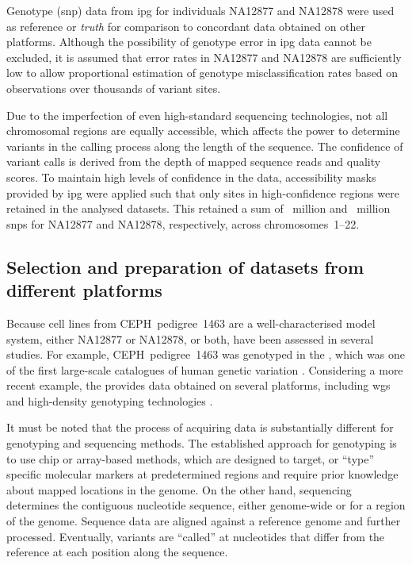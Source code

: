 %

%

Genotype (\gls{snp}) data from \gls{ipg} for individuals \textsf{NA12877} and \textsf{NA12878} were used as reference or \emph{truth} for comparison to concordant data obtained on other platforms.
Although the possibility of genotype error in \gls{ipg} data cannot be excluded, it is assumed that error rates in \textsf{NA12877} and \textsf{NA12878} are sufficiently low to allow proportional estimation of genotype misclassification rates based on observations over thousands of variant sites.

Due to the imperfection of even high-standard sequencing technologies, not all chromosomal regions are equally accessible, which affects the power to determine variants in the calling process along the length of the sequence.
The confidence of variant calls is derived from the depth of mapped sequence reads and quality scores.
To maintain high levels of confidence in the data, accessibility masks provided by \gls{ipg} were applied such that only sites in high-confidence regions were retained in the analysed datasets.
This retained a sum of ~million and ~million \glspl{snp} for \textsf{NA12877} and \textsf{NA12878}, respectively, across chromosomes~1--22.


%
\subsection{Selection and preparation of datasets from different platforms}
%

Because cell lines from CEPH~pedigree~1463 are a well-characterised model system, either \textsf{NA12877} or \textsf{NA12878}, or both, have been assessed in several studies.
For example, CEPH~pedigree~1463 was genotyped in the , which was one of the first large-scale catalogues of human genetic variation \citep{Thorisson:2005ff,Frazer:2007kha,InternationalHapMapConsortium:2010en}.
Considering a more recent example, the  provides data obtained on several platforms, including \gls{wgs} and high-density genotyping technologies \citep{Durbin:2010gj,GenomesProjectConsortium:2012co,Auton:2015gk}.

It must be noted that the process of acquiring data is substantially different for genotyping and sequencing methods.
The established approach for genotyping is to use chip or array-based methods, which are designed to target, or ``type'' specific molecular markers at predetermined regions and require prior knowledge about mapped locations in the genome.
On the other hand, sequencing determines the contiguous nucleotide sequence, either genome-wide or for a region of the genome.
Sequence data are aligned against a reference genome and further processed.
Eventually, variants are ``called'' at nucleotides that differ from the reference at each position along the sequence.

